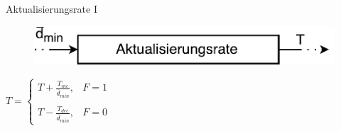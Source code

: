 \documentclass[hyperref={pdfpagelabels=false}]{beamer}
\begin{document}
\begin{frame}{Aktualisierungsrate I}
	\begin{figure}
		\centering
		\includegraphics[width=.8\linewidth]{./Bilder/update_bilder/updaterate_update}
	\end{figure}
	\vspace{2em}
	\begin{center}
		\Large
		$ T = 	\left\{\begin{array}{ll} T + \frac{T_{inc}}{\overline{d}_{min}}, & F = 1 \\
				& \\
				T - \frac{T_{dec}}{\overline{d}_{min}}, & F = 0\end{array}\right.  $
	\end{center}
\end{frame}
\end{document}
